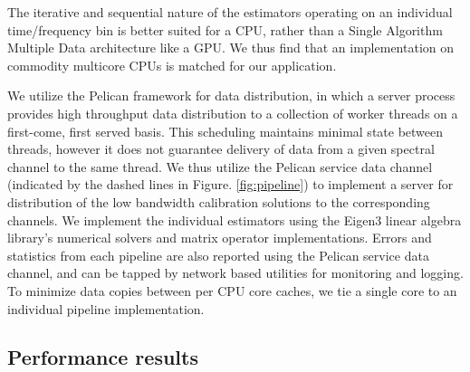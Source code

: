 \documentclass{aa}
\begin{document}
The iterative and sequential nature of the estimators operating on an individual
time/frequency bin  is better suited for  a CPU, rather than  a Single Algorithm
Multiple Data architecture  like a GPU.  We thus find  that an implementation on
commodity multicore CPUs is matched for our application.

We   utilize   the  Pelican   \citep{salvini2011pelican}   framework  for   data
distribution,  in   which  a  server  process  provides   high  throughput  data
distribution to  a collection  of worker threads  on a first-come,  first served
basis. This scheduling maintains minimal  state between threads, however it does
not guarantee delivery of data from a given spectral channel to the same thread.
We thus utilize the Pelican service  data channel (indicated by the dashed lines
in Figure.   \ref{fig:pipeline}) to implement  a server for distribution  of the
low bandwidth calibration solutions  to the corresponding channels. We implement
the  individual  estimators using  the  Eigen3  \citep{eigenweb} linear  algebra
library's  numerical solvers  and matrix  operator implementations.   Errors and
statistics from each  pipeline are also reported using  the Pelican service data
channel,  and  can be  tapped  by network  based  utilities  for monitoring  and
logging. To  minimize data copies between per  CPU core caches, we  tie a single
core to an individual pipeline implementation.


\subsection{Performance results}
\end{document}
